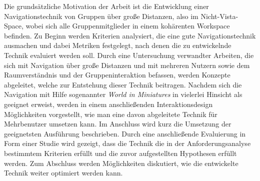 Die grundsätzliche Motivation der Arbeit ist die Entwicklung einer Navigationstechnik von Gruppen über große Distanzen, also im Nicht-Vista-Space, wobei sich alle Gruppenmitglieder in einem kohärenten Workspace befinden. Zu Beginn werden Kriterien analysiert, die eine gute Navigationstechnik ausmachen und dabei Metriken festgelegt, nach denen die zu entwickelnde Technik evaluiert werden soll.
Durch eine Untersuchung verwandter Arbeiten, die sich mit Navigation über große Distanzen und mit mehreren Nutzern sowie dem Raumverständnis und der Gruppeninteraktion befassen, werden Konzepte abgeleitet, welche zur Entstehung dieser Technik beitragen.
Nachdem sich die Navigation mit Hilfe sogenannter \textit{World in Miniatures} in vielerlei Hinsicht als geeignet erweist, werden in einem anschließenden Interaktionsdesign Möglichkeiten vorgestellt, wie man eine davon abgeleitete Technik für Mehrbenutzer umsetzen kann.
Im Anschluss wird kurz die Umsetzung der geeignetsten Ausführung beschrieben. Durch eine anschließende Evaluierung in Form einer Studie wird gezeigt, dass die Technik die in der Anforderungsanalyse bestimmtem Kriterien erfüllt und die zuvor aufgestellten Hypothesen erfüllt werden. Zum Abschluss werden Möglichkeiten diskutiert, wie die entwickelte Technik weiter optimiert werden kann.